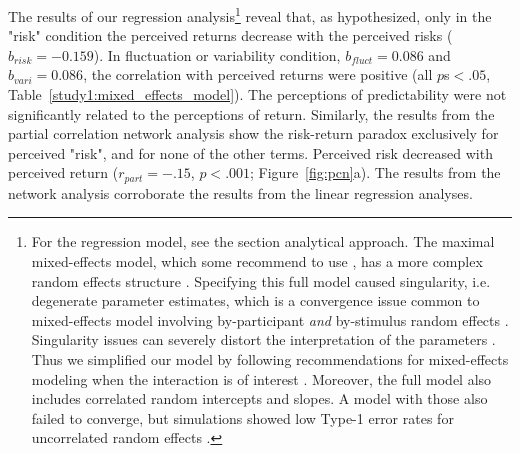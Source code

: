 \documentclass[a4paper,man, natbib,floatsintext]{apa6} %
\begin{document}
The results of our regression analysis\footnote{For the regression model, see the section analytical approach. The maximal mixed-effects model, which some recommend to use \citep{Barr2013a}, has a more complex random effects structure \citep[see][]{Judd2017}. Specifying this full model caused singularity, i.e. degenerate parameter estimates, which is a convergence issue common to mixed-effects model involving by-participant \textit{and} by-stimulus random effects \citep{Bates2015b}. Singularity issues can severely distort the interpretation of the parameters \citep{Bates2015b}. Thus we simplified our model by following recommendations for mixed-effects modeling when the interaction is of interest \citep{Barr2013a}. Moreover, the full model also includes correlated random intercepts and slopes. A model with those also failed to converge, but simulations showed low Type-1 error rates for uncorrelated random effects \citep{Matuschek2017}.}
reveal that, as hypothesized, only in the "risk" condition the perceived returns decrease with the perceived risks ($b_{risk}=-0.159$). In fluctuation or variability condition, $b_{fluct}=0.086$ and $b_{vari}=0.086$, the correlation with perceived returns were positive (all $p$s$<.05$, Table~\ref{study1:mixed_effects_model}). The perceptions of predictability were not significantly related to the perceptions of return. Similarly, the results from the partial correlation network analysis show the risk-return paradox exclusively for perceived "risk", and for none of the other terms. Perceived risk decreased with perceived return ($r_{part} = -.15$, $p < .001$; Figure~\ref{fig:pcn}a).  The results from the network analysis corroborate the results from the linear regression analyses.


\end{document}
